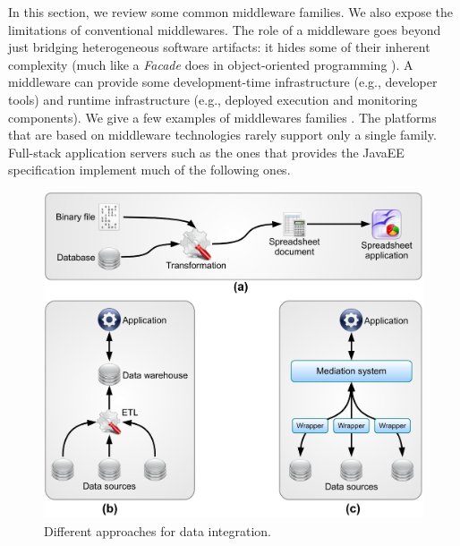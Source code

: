 In this section, we review some common middleware families. We also expose the limitations of conventional middlewares. The role of a middleware goes beyond just bridging heterogeneous software artifacts: it hides some of their inherent complexity (much like a \emph{Facade} does in object-oriented programming \cite{Gamma95}). A middleware can provide some development-time infrastructure (e.g., developer tools) and runtime infrastructure (e.g., deployed execution and monitoring components). We give a few examples of middlewares families \cite{Alonso04,HW03}. The platforms that are based on middleware technologies rarely support only a single family. Full-stack application servers such as the ones that provides the JavaEE specification implement much of the following ones.

\begin{figure}[htbp]
    \centering
    \includegraphics[width=\textwidth]{content/web-services/data-integration}
    \caption{Different approaches for data integration.}
    \label{fig:data-integration}
\end{figure}

